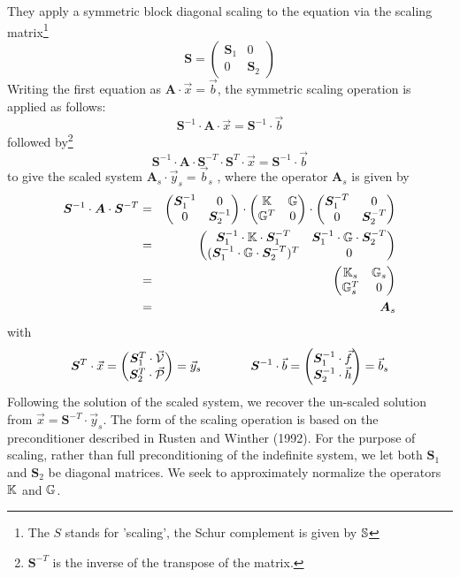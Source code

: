 They apply a symmetric block diagonal scaling to the equation via the scaling matrix\footnote{
The $S$ stands for 'scaling', the Schur complement is given by ${\mathbb{S}}$}
\[
{\bm S} = 
\begin{pmatrix}
{\bm S}_1 & 0 \\ 0 & {\bm S}_2
\end{pmatrix}
\]
Writing the first equation as ${\bm A} \cdot \vec{x} = \vec{b}$, 
the symmetric scaling operation is applied as follows:
\[
{\bm S}^{-1} \cdot {\bm A} \cdot \vec{x}= {\bm S}^{-1} \cdot \vec{b} 
\]
followed by\footnote{${\bm S}^{-T}$ is the inverse of the transpose of the matrix.} 
\[
{\bm S}^{-1} \cdot {\bm A} \cdot {\bm S}^{-T} \cdot {\bm S}^T \cdot \vec{x}= {\bm S}^{-1} \cdot \vec{b} 
\]
to give the scaled system ${\bm A}_s \cdot \vec{y}_s = \vec{b}_s$ , where the operator 
${\bm A}_s$ is given by
\begin{eqnarray}
{\bm S}^{-1} \cdot {\bm A} \cdot {\bm S}^{-T} 
&=&\begin{pmatrix}
{\bm S}_1^{-1} & 0 \\ 0 & {\bm S}_2^{-1}
\end{pmatrix}
\cdot 
\begin{pmatrix}
{\mathbb{K}} & {\mathbb{G}} \\
{\mathbb{G}}^T & 0
\end{pmatrix}
\cdot
\begin{pmatrix}
{\bm S}_1^{-T} & 0 \\ 0 & {\bm S}_2^{-T}
\end{pmatrix} \nonumber\\
&=&
\begin{pmatrix}
{\bm S}_1^{-1} \cdot {\mathbb{K}} \cdot {\bm S}_1^{-T} & {\bm S}_1^{-1} \cdot {\mathbb{G}} \cdot {\bm S}_2^{-T} \\
({\bm S}_1^{-1} \cdot {\mathbb{G}} \cdot {\bm S}_2^{-T})^{T} & 0 
\end{pmatrix} \nonumber\\
&=&
\begin{pmatrix}
{\mathbb{K}}_s & {\mathbb{G}}_s \\
{\mathbb{G}}^T_s & 0
\end{pmatrix} \nonumber\\
&=&{\bm A}_s \nonumber
\end{eqnarray}
with
\[
{\bm S}^T \cdot \vec{x} 
= 
\begin{pmatrix}
{\bm S}_1^T \cdot \vec{\cal V} \\
{\bm S}_2^T \cdot \vec{\cal P}
\end{pmatrix}
=\vec{y}_s
\qquad\qquad
{\bm S}^{-1} \cdot \vec{b} = 
\begin{pmatrix}
{\bm S}_1^{-1}\cdot\vec{f} \\
{\bm S}_2^{-1}\cdot\vec{h}
\end{pmatrix}
=\vec{b}_s
\]
Following the solution of the scaled system, we recover the un-scaled
solution from $\vec{x} = {\bm S}^{-T} \cdot  \vec{y}_s$. 
The form of the scaling operation is based
on the preconditioner described in Rusten and Winther (1992). For
the purpose of scaling, rather than full preconditioning of the indefinite system, 
we let both ${\bm S}_1$ and ${\bm S}_2$ be diagonal matrices. We seek
to approximately normalize the operators ${\mathbb{K}}$ and ${\mathbb{G}}$.

